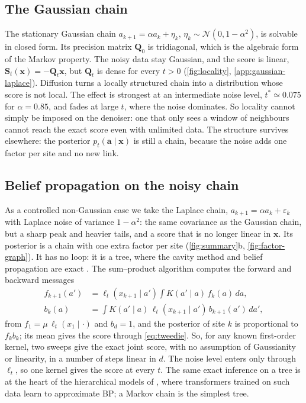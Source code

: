 \documentclass{article}
\begin{document}
\subsection{The Gaussian chain}
\label{sec:gaussian}

The stationary Gaussian chain $a_{k+1}=\alpha a_k+\eta_k$, $\eta_k\sim\mathcal N(0,1-\alpha^2)$, is solvable in closed
form. Its precision matrix $\mathbf Q_0$ is tridiagonal, which is the algebraic form of the Markov property. The noisy
data stay Gaussian, and the score is linear, $\mathbf S_t(\mathbf x)=-\mathbf Q_t\mathbf x$, but $\mathbf Q_t$ is
dense for every $t>0$ (\cref{fig:locality}, \cref{app:gaussian-laplace}). Diffusion turns a locally structured chain
into a distribution whose score is not local. The effect is strongest at an intermediate noise level, $t^*\simeq0.075$
for $\alpha=0.85$, and fades at large $t$, where the noise dominates. So locality cannot simply be imposed on the
denoiser: one that only sees a window of neighbours cannot reach the exact score even with unlimited data. The
structure survives elsewhere: the posterior $p_t(\mathbf a\mid\mathbf x)$ is still a chain, because the noise adds one
factor per site and no new link.

\subsection{Belief propagation on the noisy chain}
\label{sec:tree}

As a controlled non-Gaussian case we take the Laplace chain, $a_{k+1}=\alpha a_k+\varepsilon_k$ with Laplace noise of
variance $1-\alpha^2$: the same covariance as the Gaussian chain, but a sharp peak and heavier tails, and a score that
is no longer linear in $\mathbf x$. Its posterior is a chain with one extra factor per site (\cref{fig:summary}b,
\cref{fig:factor-graph}). It has no loop: it is a tree, where the cavity method and belief propagation are exact
\cite{mezard2001bethe,mezard2006reconstruction,mezard2009information}. The sum--product algorithm
\cite{pearl1988probabilistic,kschischang2001factor,yedidia2003understanding} computes the forward and backward messages
\begin{equation}
\begin{aligned}
    f_{k+1}(a')&=\ell_t(x_{k+1}\mid a')\textstyle\int K(a'\mid a)\,f_k(a)\,da,\\
    b_k(a)&=\textstyle\int K(a'\mid a)\,\ell_t(x_{k+1}\mid a')\,b_{k+1}(a')\,da',
\end{aligned}
\label{eq:bp}
\end{equation}
from $f_1=\mu\,\ell_t(x_1\mid\cdot)$ and $b_d=1$, and the posterior of site $k$ is proportional to $f_kb_k$; its mean
gives the score through \cref{eq:tweedie}. So, for any known first-order kernel, two sweeps give the exact joint score,
with no assumption of Gaussianity or linearity, in a number of steps linear in $d$. The noise level enters only through
$\ell_t$, so one kernel gives the score at every $t$. The same exact inference on a tree is at the heart of the
hierarchical models of \cite{garnierbrun2024transformers}, where transformers trained on such data learn to approximate
BP; a Markov chain is the simplest tree.
\end{document}
